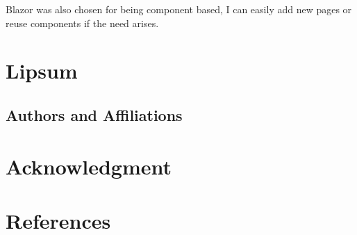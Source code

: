 \documentclass[conference]{IEEEtran}
\begin{document}
			Blazor was also chosen for being component based, I can easily add new pages or reuse components if the need arises.
			
	
	\section{Lipsum}
	
	\subsection{Authors and Affiliations}

	
	\section{Acknowledgment}
	
	\section*{References}
	
	
\end{document}
